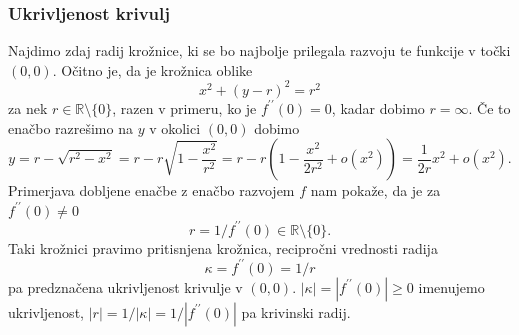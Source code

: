 \documentclass[8pt]{beamer}
\theoremstyle{definition}
\theoremstyle{remark}
\theoremstyle{plain}
\numberwithin{equation}{section}  %
\begin{document}
\begin{frame}
    \frametitle{Ukrivljenost krivulj}

    Najdimo zdaj radij krožnice, ki se bo najbolje prilegala razvoju te funkcije v točki $(0,0)$. Očitno je, da je krožnica oblike
    \begin{equation*}
        x^2+(y-r)^2=r^2
    \end{equation*}
    za nek $r \in \mathbb{R} \setminus \{0\}$, razen v primeru, ko je $f^{\prime \prime}(0)=0$, kadar dobimo $r=\infty$. \pause Če to enačbo razrešimo na $y$ v okolici $(0,0)$ dobimo 
    \begin{equation*}
        y=r-\sqrt{r^2-x^2}=r-r \sqrt{1-\frac{x^2}{r^2}}=r-r\left(1-\frac{x^2}{2 r^2}+o\left(x^2\right)\right)=\frac{1}{2 r} x^2+o\left(x^2\right).
    \end{equation*}
    \pause
    Primerjava dobljene enačbe z enačbo razvojem $f$ nam pokaže, da je za $f^{\prime \prime}(0)\neq0$ 
    \begin{equation*}
        r=1 / f^{\prime \prime}(0) \in \mathbb{R} \setminus \{0\}.
    \end{equation*}
    \pause 
    Taki krožnici pravimo \textcolor{red1}{pritisnjena krožnica}, recipročni vrednosti radija 
    \begin{equation*}
        \kappa=f^{\prime \prime}(0)=1 / r
    \end{equation*}
    pa \textcolor{red1}{predznačena ukrivljenost} krivulje v $(0,0)$. $|\kappa|=\left|f^{\prime \prime}(0)\right| \geq 0$ imenujemo \textcolor{red1}{ukrivljenost}, $|r|=1 /|\kappa|=1 /\left|f^{\prime \prime}(0)\right|$ pa \textcolor{red1}{krivinski radij}. 

\end{frame}
\end{document}
